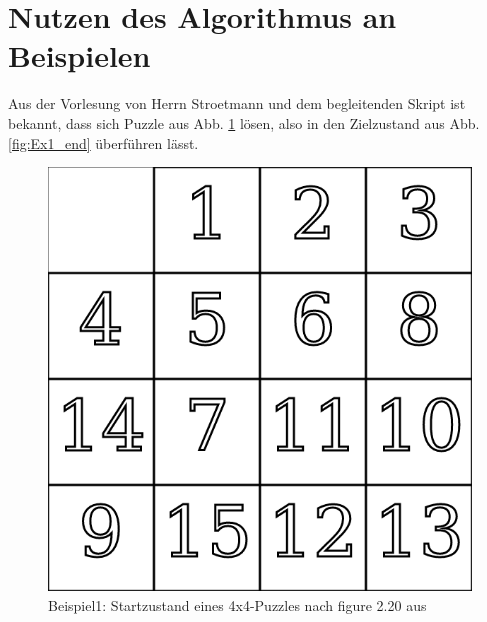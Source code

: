 \section{Nutzen des Algorithmus an Beispielen} %
\label{sec:PermutationExamples}
Aus der Vorlesung von Herrn Stroetmann und dem begleitenden Skript \autocite{github-stroetmann:online} ist bekannt, dass sich Puzzle aus Abb. \ref{fig:Ex1_start} lösen, also in den Zielzustand aus Abb. \ref{fig:Ex1_end} überführen lässt.\\
\begin{minipage}{\linewidth}
	\begin{minipage}[t]{0.45\linewidth}
		\begin{figure}[H]
			\centering
			\includegraphics[width=\linewidth,keepaspectratio]{img/Ex1_start.png}
			\captionsetup{format=plain, indention=0pt}
			\caption{Beispiel1: Startzustand eines 4x4-Puzzles nach figure 2.20 aus \autocite{github-stroetmann:online} \label{fig:Ex1_start}}
		\end{figure}
	\end{minipage}
	\hfill
	\begin{minipage}[t]{0.45\linewidth}
		\begin{figure}[H]
			\centering

\end{figure}
\end{minipage}
\end{minipage}
